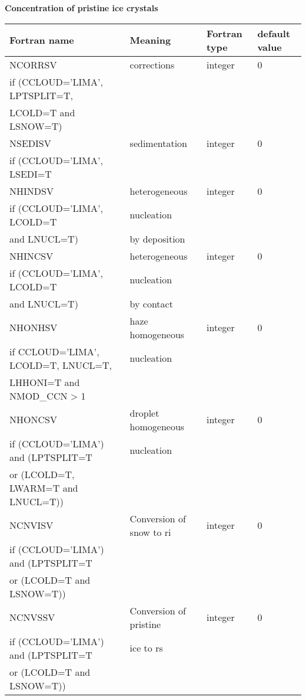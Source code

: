 \textbf{Concentration of pristine ice crystals}
\begin{longtable} {|p{}|p{}|>{\centering}p{}|p{}<{\centering}|}
\hline
Fortran name & Meaning & Fortran type & default value \\
\hline \hline
\endhead
NCORRSV & corrections & integer & 0 \\ \nopagebreak
if (CCLOUD='LIMA', LPTSPLIT=T, &&& \\ \nopagebreak
LCOLD=T and LSNOW=T) &&& \\\hline

NSEDISV & sedimentation& integer & 0 \\ \nopagebreak
if (CCLOUD='LIMA', LSEDI=T &&& \\\hline

NHINDSV & heterogeneous & integer & 0 \\ \nopagebreak
if (CCLOUD='LIMA', LCOLD=T &nucleation && \\ \nopagebreak
and LNUCL=T) & by deposition && \\\hline

NHINCSV & heterogeneous   & integer & 0 \\ \nopagebreak
if (CCLOUD='LIMA', LCOLD=T &nucleation&& \\ \nopagebreak
and LNUCL=T) &by contact && \\\hline

NHONHSV & haze homogeneous  & integer & 0 \\ \nopagebreak
if CCLOUD='LIMA', LCOLD=T, LNUCL=T, &nucleation && \\ \nopagebreak
LHHONI=T and NMOD\_CCN > 1 &&& \\\hline

NHONCSV & droplet homogeneous  & integer & 0 \\ \nopagebreak
if (CCLOUD='LIMA') and (LPTSPLIT=T &nucleation && \\ \nopagebreak
or (LCOLD=T, LWARM=T and LNUCL=T)) &&& \\\hline

NCNVISV & Conversion of snow to ri& integer & 0 \\ \nopagebreak
if (CCLOUD='LIMA') and (LPTSPLIT=T &&& \\ \nopagebreak
or (LCOLD=T and LSNOW=T)) &&& \\\hline

NCNVSSV & Conversion of pristine & integer & 0 \\ \nopagebreak
if (CCLOUD='LIMA') and (LPTSPLIT=T &ice to rs && \\ \nopagebreak
or (LCOLD=T and LSNOW=T)) &&& \\\hline


\end{longtable}
